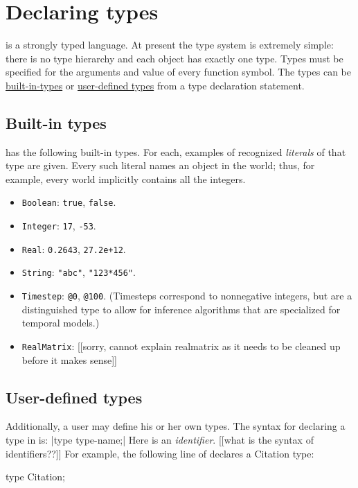 \documentclass[12pt]{article}
\begin{document}
\section{Declaring types}\label{type-declaration-section}

\bl is a strongly typed language. At present the type system is extremely simple: there is no type hierarchy
and each object has exactly one type. Types must be specified for the arguments and value of every function symbol.
The types can be \hyperref[builtin-type-section]{built-in-types} or \hyperref[user-type-section]{user-defined types} from a type declaration statement.


\subsection{Built-in types}\label{builtin-type-section}

\bl has the following built-in types. For each, examples of recognized {\em literals} of that type are given.
Every such literal names an object in the world; thus, for example, every world implicitly contains all the integers.
\begin{itemize}
\item \verb|Boolean|: \verb|true|, \verb|false|.
\item \verb|Integer|: \verb|17|, \verb|-53|.
\item \verb|Real|: \verb|0.2643|, \verb|27.2e+12|.
\item \verb|String|: \verb|"abc"|, \verb|"123*456"|.
\item \verb|Timestep|: \verb|@0|, \verb|@100|. (Timesteps correspond to nonnegative integers, but are a distinguished type
to allow for inference algorithms that are specialized for temporal models.)
\item \verb|RealMatrix|: [[sorry, cannot explain realmatrix as it needs to be cleaned up before it makes sense]]
\end{itemize}


\subsection{User-defined types}\label{user-type-section}

Additionally, a user may define his or her own types.  The syntax for declaring a type in \bl is:
\blog|type type-name;|
Here  is an {\it identifier}. [[what is the syntax of identifiers??]]
For example, the following line of \bl declares a Citation type:
\begin{blogcode}
type Citation;
\end{blogcode}
\end{document}
